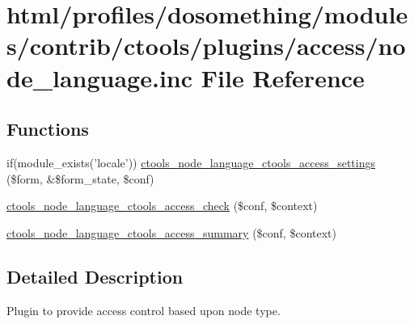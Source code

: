 \hypertarget{node__language_8inc}{
\section{html/profiles/dosomething/modules/contrib/ctools/plugins/access/node\_\-language.inc File Reference}
\label{node__language_8inc}
}
\subsection*{Functions}
\begin{DoxyCompactItemize}
\item 
if(module\_\-exists('locale')) \hyperlink{node__language_8inc_a9fe69e37bf8d309bcf412074e74e6da1}{ctools\_\-node\_\-language\_\-ctools\_\-access\_\-settings} (\$form, \&\$form\_\-state, \$conf)
\item 
\hyperlink{node__language_8inc_ac27ae2da8cbcc5a977b533f3df2c5784}{ctools\_\-node\_\-language\_\-ctools\_\-access\_\-check} (\$conf, \$context)
\item 
\hyperlink{node__language_8inc_a07fd33a1e182bf2c785552f590591c30}{ctools\_\-node\_\-language\_\-ctools\_\-access\_\-summary} (\$conf, \$context)
\end{DoxyCompactItemize}


\subsection{Detailed Description}
Plugin to provide access control based upon node type. 

